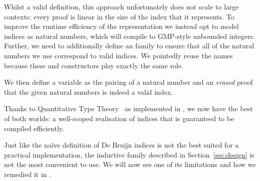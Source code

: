 Whilst a valid definition, this approach unfortunately does not scale to
large contexts:
%
every  proof is linear in the size of the \DeBruijn{}
index that it represents.
%
To improve the runtime efficiency of the representation we instead opt to
model \DeBruijn{} indices as natural numbers, which \Idris{} will compile to
GMP-style unbounded integers.
%
Further, we need to additionally define an  family to ensure that
all of the natural numbers we use correspond to valid indices.
%
We pointedly reuse the  names because these 
and  constructors play exactly the same role.


\noindent
We then define a variable as the pairing of a natural number and an \emph{erased}
proof that the given natural numbers is indeed a valid \DeBruijn{} index.


Thanks to Quantitative Type Theory~\cite{DBLP:conf/birthday/McBride16,DBLP:conf/lics/Atkey18}
as implemented in \Idris{},
we now have the best of both worlds: a well-scoped realisation of \DeBruijn{} indices
that is guaranteed to be compiled efficiently.


Just like the naïve definition of De Bruijn indices is not the
best suited for a practical implementation,
the inductive family  described in Section~\ref{sec:design}
is not the most convenient to use.
%
We will now see one of its limitations and how we remedied it in
\Velo{}.

